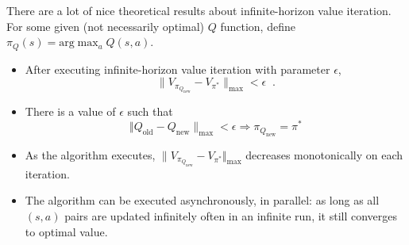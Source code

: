 There are a lot of nice theoretical results about infinite-horizon value iteration.
For some given (not necessarily optimal) $Q$ function, define
$\pi_{Q}(s) = \text{arg}\max_{a}Q(s, a)$.   
\begin{itemize}
\item After executing infinite-horizon value
iteration with parameter $\epsilon$,  
\begin{equation}
\lVert  V_{\pi_{Q_{\text{new}}}} - V_{\pi^*} \rVert_{\text{max}} < \epsilon \;\; .
\end{equation}
%
\item
There is a value of $\epsilon$ such that
\begin{equation}
 \Vert Q_{\text{old}} - Q_{\text{new}} \rVert_{\text{max}} <
\epsilon \Longrightarrow \pi_{Q_{\text{new}}} = \pi^* 
\end{equation}  
\item  As the algorithm executes,   
$\lVert V_{\pi_{Q_{\text{new}}}} - V_{\pi^*} \Vert_{\text{max}}$ decreases
monotonically on each iteration.
\item The algorithm  can be executed asynchronously, in parallel: as
  long as all $(s, a)$ pairs are updated infinitely often in an
  infinite run, it still converges to optimal value. 

\end{itemize}

